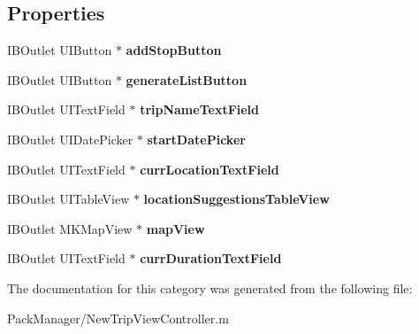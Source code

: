 \subsection*{Properties}
\begin{DoxyCompactItemize}
\item 
\hypertarget{category_new_trip_view_controller_07_08_a4de5831400f9c1599152b534ca83a801}{I\-B\-Outlet U\-I\-Button $\ast$ {\bfseries add\-Stop\-Button}}\label{category_new_trip_view_controller_07_08_a4de5831400f9c1599152b534ca83a801}

\item 
\hypertarget{category_new_trip_view_controller_07_08_abbce0a1b0d8abce963ced44be5f6cd33}{I\-B\-Outlet U\-I\-Button $\ast$ {\bfseries generate\-List\-Button}}\label{category_new_trip_view_controller_07_08_abbce0a1b0d8abce963ced44be5f6cd33}

\item 
\hypertarget{category_new_trip_view_controller_07_08_a21eb151ed2a52e4bcf751cd72f57233c}{I\-B\-Outlet U\-I\-Text\-Field $\ast$ {\bfseries trip\-Name\-Text\-Field}}\label{category_new_trip_view_controller_07_08_a21eb151ed2a52e4bcf751cd72f57233c}

\item 
\hypertarget{category_new_trip_view_controller_07_08_ac36b7787abef9c7a1fe648c471a8a8ee}{I\-B\-Outlet U\-I\-Date\-Picker $\ast$ {\bfseries start\-Date\-Picker}}\label{category_new_trip_view_controller_07_08_ac36b7787abef9c7a1fe648c471a8a8ee}

\item 
\hypertarget{category_new_trip_view_controller_07_08_a9e87d61abcadfeaca563b76bfa4a78fa}{I\-B\-Outlet U\-I\-Text\-Field $\ast$ {\bfseries curr\-Location\-Text\-Field}}\label{category_new_trip_view_controller_07_08_a9e87d61abcadfeaca563b76bfa4a78fa}

\item 
\hypertarget{category_new_trip_view_controller_07_08_a77f519b5859833202b99a0234f6835eb}{I\-B\-Outlet U\-I\-Table\-View $\ast$ {\bfseries location\-Suggestions\-Table\-View}}\label{category_new_trip_view_controller_07_08_a77f519b5859833202b99a0234f6835eb}

\item 
\hypertarget{category_new_trip_view_controller_07_08_a8e98bb0c2df9d96bcf86193f0c116f79}{I\-B\-Outlet M\-K\-Map\-View $\ast$ {\bfseries map\-View}}\label{category_new_trip_view_controller_07_08_a8e98bb0c2df9d96bcf86193f0c116f79}

\item 
\hypertarget{category_new_trip_view_controller_07_08_a4149be533fd16b7d618aeb07eff1821c}{I\-B\-Outlet U\-I\-Text\-Field $\ast$ {\bfseries curr\-Duration\-Text\-Field}}\label{category_new_trip_view_controller_07_08_a4149be533fd16b7d618aeb07eff1821c}

\end{DoxyCompactItemize}


The documentation for this category was generated from the following file\-:\begin{DoxyCompactItemize}
\item 
Pack\-Manager/New\-Trip\-View\-Controller.\-m\end{DoxyCompactItemize}
